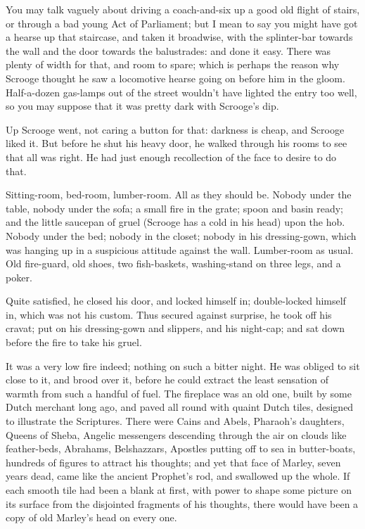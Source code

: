 \documentclass[11pt,twoside]{article}\makeatletter
\begin{document}
You may talk vaguely about driving a coach-and-six up a good old flight of stairs, or through a bad young Act of Parliament; but I mean to say you might have got a hearse up that staircase, and taken it broadwise, with the splinter-bar towards the wall and the door towards the balustrades: and done it easy.  There was plenty of width for that, and room to spare; which is perhaps the reason why Scrooge thought he saw a locomotive hearse going on before him in the gloom. Half-a-dozen gas-lamps out of the street wouldn't have lighted the entry too well, so you may suppose that it was pretty dark with Scrooge's dip.  \par
Up Scrooge went, not caring a button for that: darkness is cheap, and Scrooge liked it.  But before he shut his heavy door, he walked through his rooms to see that all was right. He had just enough recollection of the face to desire to do that.  \par
Sitting-room, bed-room, lumber-room.  All as they should be.  Nobody under the table, nobody under the sofa; a small fire in the grate; spoon and basin ready; and the little saucepan of gruel (Scrooge has a cold in his head) upon the hob. Nobody under the bed; nobody in the closet; nobody in his dressing-gown, which was hanging up in a suspicious attitude against the wall.  Lumber-room as usual.  Old fire-guard, old shoes, two fish-baskets, washing-stand on three legs, and a poker.  \par
Quite satisfied, he closed his door, and locked himself in; double-locked himself in, which was not his custom.  Thus secured against surprise, he took off his cravat; put on his dressing-gown and slippers, and his night-cap; and sat down before the fire to take his gruel.  \par
It was a very low fire indeed; nothing on such a bitter night.  He was obliged to sit close to it, and brood over it, before he could extract the least sensation of warmth from such a handful of fuel.  The fireplace was an old one, built by some Dutch merchant long ago, and paved all round with quaint Dutch tiles, designed to illustrate the Scriptures. There were Cains and Abels, Pharaoh's daughters, Queens of Sheba, Angelic messengers descending through the air on clouds like feather-beds, Abrahams, Belshazzars, Apostles putting off to sea in butter-boats, hundreds of figures to attract his thoughts; and yet that face of Marley, seven years dead, came like the ancient Prophet's rod, and swallowed up the whole.  If each smooth tile had been a blank at first, with power to shape some picture on its surface from the disjointed fragments of his thoughts, there would have been a copy of old Marley's head on every one. \par
\end{document}
